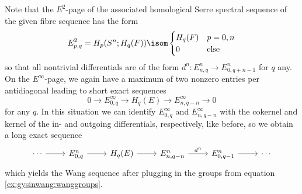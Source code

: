 \begin{solution}
\begin{enumerate}
			Note that the $E^2$-page of the associated homological Serre spectral sequence of the given fibre sequence has the form
			\begin{equation}\label{ex:gysinwang:wanggroups}
				E^2_{p, q} = H_p(S^n; H_q(F)) \isom \begin{cases}
					H_q(F)  & p = 0, n \\
					0 		& \text{else}
				\end{cases}
			\end{equation}
			so that all nontrivial differentials are of the form $d^n\colon E^n_{n, q} \to E^n_{0, q + n - 1}$ for $q$ any.
			On the $E^\infty$-page, we again have a maximum of two nonzero entries per antidiagonal leading to short exact sequences
			\begin{equation*}
				0 \to E^\infty_{0, q} \to H_q(E) \to E^\infty_{n, q - n} \to 0
			\end{equation*}
			for any $q$.
			In this situation we can identify $E^\infty_{0, q}$ and $E^\infty_{n, q - n}$ with the cokernel and kernel of the in- and outgoing differentials, respectively, like before, so we obtain a long exact sequence
			\begin{equation*}
				\begin{tikzcd}
					\cdots 
							\ar[r]
						& E^n_{0, q}
							\ar[r]
						& H_q(E)
							\ar[r]
						& E^n_{n, q - n}
							\ar[r, "d^n"]
						& E^n_{0, q - 1}
							\ar[r]
						& \cdots
				\end{tikzcd}
			\end{equation*}
			which yields the Wang sequence after plugging in the groups from equation \eqref{ex:gysinwang:wanggroups}.
			\qedhere
	\end{enumerate}
\end{solution}

